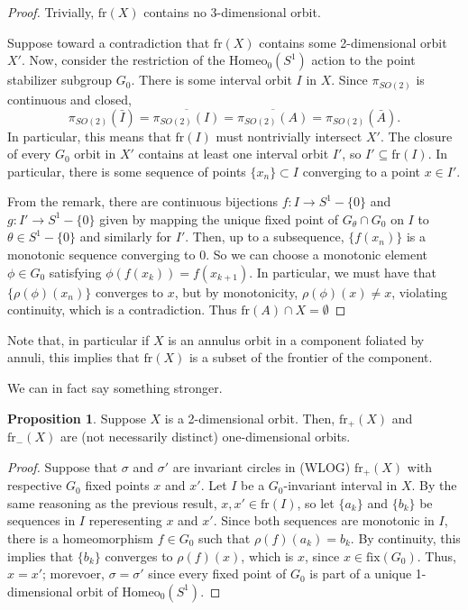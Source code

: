 \documentclass[10pt, oneside]{article}
\newcommand{\homeoS}{\text{Homeo}_0(S^1)}
\theoremstyle{definition}
\newtheorem{prop}{Proposition}
\theoremstyle{definition}
\begin{document}
\begin{proof}
    Trivially, $\text{fr}(X)$ contains no 3-dimensional orbit.

    Suppose toward a contradiction that $\text{fr}(X)$ contains some 2-dimensional orbit $X'$. Now, consider the restriction of the $\homeoS$ action to the point stabilizer subgroup $G_0$. There is some interval orbit $I$ in $X$. Since $\pi_{SO(2)}$ is continuous and closed, $$\pi_{SO(2)}(\bar{I}) = \overline{\pi_{SO(2)}(I)} = \overline{\pi_{SO(2)}(A)} = \pi_{SO(2)}(\bar{A}).$$ In particular, this means that $\text{fr}(I)$ must nontrivially intersect $X'$. The closure of every $G_0$ orbit in $X'$ contains at least one interval orbit $I'$, so $I'\subseteq \text{fr}(I)$. In particular, there is some sequence of points $\{x_n\}\subset I$ converging to a point $x\in I'$.

    From the remark, there are continuous bijections $f:I\to S^1-\{0\}$ and $g:I'\to S^1-\{0\}$ given by mapping the unique fixed point of $G_\theta\cap G_0$ on $I$ to $\theta\in S^1 - \{0\}$ and similarly for $I'$. Then, up to a subsequence, $\{f(x_n)\}$ is a monotonic sequence converging to 0. So we can choose a monotonic element $\phi\in G_0$ satisfying $\phi(f(x_k)) = f(x_{k+1})$. In particular, we must have that $\{\rho(\phi)( x_n)\}$ converges to $x$, but by monotonicity, $\rho(\phi)(x) \neq x$, violating continuity, which is a contradiction. Thus $\text{fr}(A)\cap X = \emptyset$
\end{proof}

Note that, in particular if $X$ is an annulus orbit in a component foliated by annuli, this implies that $\text{fr}(X)$ is a subset of the frontier of the component.

We can in fact say something stronger.

\begin{prop}
    Suppose $X$ is a 2-dimensional orbit. Then, $\text{fr}_+(X)$ and $\text{fr}_-(X)$ are (not necessarily distinct) one-dimensional orbits.
\end{prop}

\begin{proof}
    Suppose that $\sigma$ and $\sigma'$ are invariant circles in (WLOG) $\text{fr}_+(X)$ with respective $G_0$ fixed points $x$ and $x'$. Let $I$ be a $G_0$-invariant interval in $X$. By the same reasoning as the previous result, $x, x'\in \text{fr}(I)$, so let $\{a_k\}$ and $\{b_k\}$ be sequences in $I$ reperesenting $x$ and $x'$. Since both sequences are monotonic in $I$, there is a homeomorphism $f\in G_0$ such that $\rho(f)(a_k) = b_k$. By continuity, this implies that $\{b_k\}$ converges to $\rho(f)(x)$, which is $x$, since $x\in\text{fix}(G_0)$. Thus, $x=x'$; morevoer, $\sigma = \sigma'$ since every fixed point of $G_0$ is part of a unique 1-dimensional orbit of $\homeoS$.
\end{proof}
\end{document}
